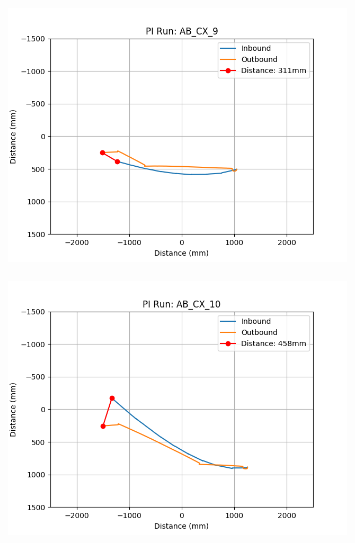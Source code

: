 \documentclass[a4paper,11pt,twoside,openright]{article}
\begin{document}
\begin{figure}[h!]
  \centering
  \includegraphics[width=0.8\textwidth]{AB_CX_9}
  \caption{\label{fig:abcx9}}
\end{figure}

\begin{figure}[h!]
  \centering
  \includegraphics[width=0.8\textwidth]{AB_CX_10}
  \caption{\label{fig:abcx10}}
\end{figure}
\end{document}
